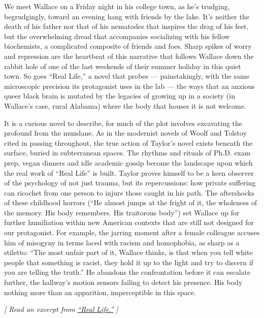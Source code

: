 We meet Wallace on a Friday night in his college town, as he's trudging,
begrudgingly, toward an evening hang with friends by the lake. It's
neither the death of his father nor that of his nematodes that inspires
the drag of his feet, but the overwhelming dread that accompanies
socializing with his fellow biochemists, a complicated composite of
friends and foes. Sharp spikes of worry and repression are the heartbeat
of this narrative that follows Wallace down the rabbit hole of one of
the last weekends of their summer holiday in this quiet town. So goes
``Real Life,'' a novel that probes --- painstakingly, with the same
microscopic precision its protagonist uses in the lab --- the ways that
an anxious queer black brain is mutated by the legacies of growing up in
a society (in Wallace's case, rural Alabama) where the body that houses
it is not welcome.

It is a curious novel to describe, for much of the plot involves
excavating the profound from the mundane. As in the modernist novels of
Woolf and Tolstoy cited in passing throughout, the true action of
Taylor's novel exists beneath the surface, buried in subterranean
spaces. The rhythms and rituals of Ph.D. exam prep, vegan dinners and
idle academic gossip become the landscape upon which the real work of
``Real Life'' is built. Taylor proves himself to be a keen observer of
the psychology of not just trauma, but its repercussions: how private
suffering can ricochet from one person to injure those caught in his
path. The aftershocks of these childhood horrors (``He almost jumps at
the fright of it, the wholeness of the memory. His body remembers. His
traitorous body'') set Wallace up for further humiliation within new
American contexts that are still not designed for our protagonist. For
example, the jarring moment after a female colleague accuses him of
misogyny in terms laced with racism and homophobia, as sharp as a
stiletto: ``The most unfair part of it, Wallace thinks, is that when you
tell white people that something is racist, they hold it up to the light
and try to discern if you are telling the truth.'' He abandons the
confrontation before it can escalate further, the hallway's motion
sensors failing to detect his presence. His body nothing more than an
apparition, imperceptible in this space.

\emph{{[} Read an excerpt from}
\href{https://www.nytimes.com/2020/02/18/books/review/real-life-by-brandon-taylor-an-excerpt.html}{\emph{``Real
Life.''}} \emph{{]}}

